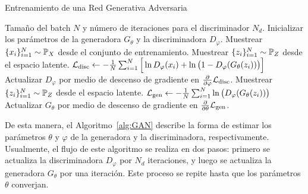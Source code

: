 \begin{algorithm}[t!]
	\caption{Entrenamiento de una Red Generativa Adversaria}\label{alg:GAN}
	\begin{algorithmic}[1]
		\Require Tamaño del batch $N$ y número de iteraciones para el discriminador $N_d$.
		\State Inicializar los parámetros de la generadora $G_\theta$ y la discriminadora $D_\varphi$.
		\State Muestrear $\{x_i\}_{i=1}^{N} \sim \Prob_X$ desde el conjunto de entrenamiento.
		\State Muestrear $\{z_i\}_{i=1}^{N} \sim \Prob_Z$ desde el espacio latente.
		\State $\cL_{\mathrm{disc}} \gets -\frac{1}{N}\sum_{i=1}^{N} \Big[ \ln D_\varphi(x_i) + \ln \qty\big(1 - D_\varphi(G_\theta(z_i))) \Big]$
		\State Actualizar $D_\varphi$ por medio de descenso de gradiente en $\pdv{\varphi} \cL_{\mathrm{disc}}$.
		\EndFor
		\State Muestrear $\{z_i\}_{i=1}^{N} \sim \Prob_Z$ desde el espacio latente.
		\State $\cL_{\mathrm{gen}} \gets - \frac{1}{N}\sum_{i=1}^{N} \ln \qty\big(D_\varphi(G_\theta(z_i)))$
		\State Actualizar $G_\theta$ por medio de descenso de gradiente en $\pdv{\theta} \mathcal{L}_{\mathrm{gen}}$.
		\EndWhile
	\end{algorithmic}
\end{algorithm}

De esta manera, el Algoritmo~\ref*{alg:GAN} describe la forma de estimar los parámetros $\theta$ y $\varphi$ de la generadora y la discriminadora, respectivamente. Usualmente, el flujo de este algoritmo se realiza en dos pasos: primero se actualiza la discriminadora $D_\varphi$ por $N_d$ iteraciones, y luego se actualiza la generadora $G_\theta$ por una iteración. Este proceso se repite hasta que los parámetros $\theta$ converjan.

